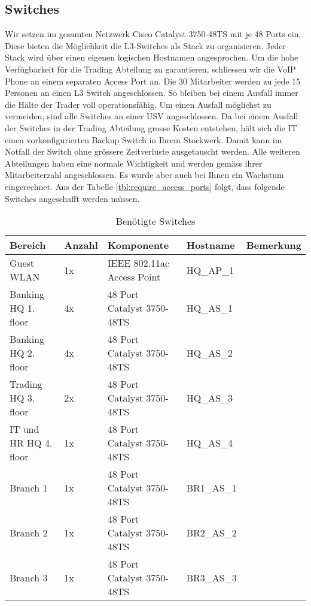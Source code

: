 \subsection{Switches}
Wir setzen im gesamten Netzwerk Cisco Catalyst 3750-48TS mit je 48 Ports ein. Diese bieten die Möglichkeit die L3-Switches als Stack zu organisieren. Jeder Stack wird über einen eigenen logischen Hostnamen angesprochen. Um die hohe Verfügbarkeit für die Trading Abteilung zu garantieren, schliessen wir die VoIP Phone an einem separaten Access Port an. Die 30 Mitarbeiter werden zu jede 15 Personen an einen L3 Switch angeschlossen. So bleiben bei einem Ausfall immer die Hälte der Trader voll operationsfähig. Um einen Ausfall möglichst zu vermeiden, sind alle Switches an einer USV angeschlossen. Da bei einem Ausfall der Switches in der Trading Abteilung grosse Kosten entstehen, hält sich die IT einen vorkonfigurierten Backup Switch in Ihrem Stockwerk. Damit kann im Notfall der Switch ohne grössere Zeitverluste ausgetauscht werden. Alle weiteren Abteilungen haben eine normale Wichtigkeit und werden gemäss ihrer Mitarbeiterzahl angeschlossen. Es wurde aber auch bei Ihnen ein Wachstum eingerechnet. Aus der Tabelle \ref{tbl:require_access_ports} folgt, dass folgende Switches angeschafft werden müssen. 
\begin{table}[h]
	\centering
	\begin{tabu} to \linewidth {l l l X X}
		\toprule 
		Bereich & Anzahl & Komponente & Hostname & Bemerkung \\
		\midrule
		Guest WLAN & 1x & IEEE 802.11ac Access Point & HQ\_AP\_1 & \\
		Banking HQ 1. floor & 4x & 48 Port Catalyst 3750-48TS & HQ\_AS\_1 & \\
		Banking HQ 2. floor & 4x & 48 Port Catalyst 3750-48TS & HQ\_AS\_2 & \\
		Trading HQ 3. floor & 2x & 48 Port Catalyst 3750-48TS & HQ\_AS\_3 & \\
		IT und HR HQ 4. floor & 1x & 48 Port Catalyst 3750-48TS & HQ\_AS\_4 & \\
		Branch 1 & 1x & 48 Port Catalyst 3750-48TS & BR1\_AS\_1 & \\
		Branch 2 & 1x & 48 Port Catalyst 3750-48TS & BR2\_AS\_2 & \\
		Branch 3 & 1x & 48 Port Catalyst 3750-48TS & BR3\_AS\_3 & \\
		\bottomrule 
	\end{tabu} 
	\caption{Benötigte Switches}
\end{table}

